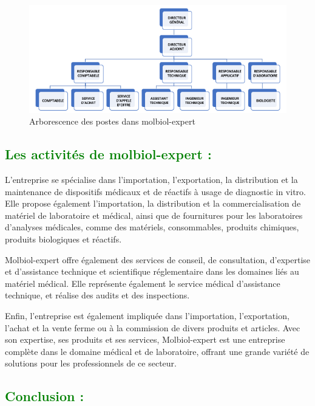 \begin{flushleft}
	\begin{figure}[h]
		\centering
		\includegraphics{chapitres/images/postes.PNG}
		\caption{Arborescence des postes dans molbiol-expert}
		\label{fig:labelname}
	\end{figure}

	
	\subsection{\textcolor{green}{Les activités de molbiol-expert :}}
	
	 L'entreprise se spécialise dans l'importation, l'exportation, la distribution et la maintenance de dispositifs médicaux et de réactifs à usage de diagnostic in vitro. Elle propose également l'importation, la distribution et la commercialisation de matériel de laboratoire et médical, ainsi que de fournitures pour les laboratoires d'analyses médicales, comme des matériels, consommables, produits chimiques, produits biologiques et réactifs.\newline
	
	Molbiol-expert offre également des services de conseil, de consultation, d'expertise et d'assistance technique et scientifique réglementaire dans les domaines liés au matériel médical. Elle représente également le service médical d'assistance technique, et réalise des audits et des inspections.\newline
	
	Enfin, l'entreprise est également impliquée dans l'importation, l'exportation, l'achat et la vente ferme ou à la commission de divers produits et articles. Avec son expertise, ses produits et ses services, Molbiol-expert est une entreprise complète dans le domaine médical et de laboratoire, offrant une grande variété de solutions pour les professionnels de ce secteur.\newline
	
	\subsection{\textcolor{green}{Conclusion :}}


\end{flushleft}
